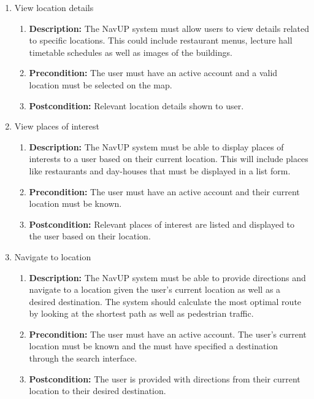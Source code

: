 \documentclass{article}
\begin{document}
\begin{enumerate}
\begin{enumerate}
		
		\item View location details
		\begin{enumerate}
			\item \textbf{Description:} The NavUP system must allow users to view details related to specific locations. This could include restaurant menus, lecture hall timetable schedules as well as images of the buildings.
			\item \textbf{Precondition:} The user must have an active account and a valid location must be selected on the map.
			\item \textbf{Postcondition:} Relevant location details shown to user.\newline
		\end{enumerate}
		
		\item View places of interest
		\begin{enumerate}
			\item \textbf{Description:} The NavUP system must be able to display places of interests to a user based on their current location. This will include places like restaurants and day-houses that must be displayed in a list form. 
			\item \textbf{Precondition:} The user must have an active account and their current location must be known.  
			\item \textbf{Postcondition:} Relevant places of interest are listed and displayed to the user based on their location.\newline
		\end{enumerate}
		
		\item Navigate to location
		\begin{enumerate}
			\item \textbf{Description:} The NavUP system must be able to provide directions and navigate to a location given the user’s current location as well as a desired destination. The system should calculate the most optimal route by looking at the shortest path as well as pedestrian traffic.
			\item \textbf{Precondition:} The user must have an active account. The user’s current location must be known and the must have specified a destination through the search interface.
			\item \textbf{Postcondition:} The user is provided with directions from their current location to their desired destination.\newline
		\end{enumerate}
		

\end{enumerate}
\end{enumerate}
\end{document}
